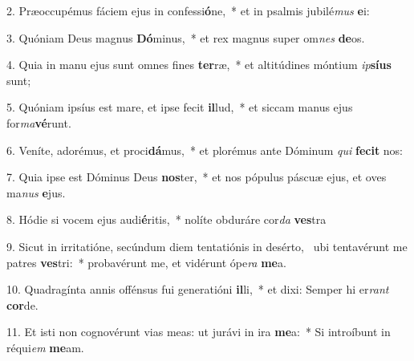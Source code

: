 2. Præoccupémus fáciem ejus in confessi\textbf{ó}ne,~*  et in psalmis jubilé\textit{mus} \textbf{e}i:\

3. Quóniam Deus magnus \textbf{Dó}minus,~*  et rex magnus super om\textit{nes} \textbf{de}os.\

4. Quia in manu ejus sunt omnes fines \textbf{ter}ræ,~*  et altitúdines móntium \textit{ip}\textbf{sí}\textbf{us} sunt;\

5. Quóniam ipsíus est mare, et ipse fecit \textbf{il}lud,~*  et siccam manus ejus for\textit{ma}\textbf{vé}runt.\

6. Veníte, adorémus, et proci\textbf{dá}mus,~*  et plorémus ante Dóminum \textit{qui} \textbf{fe}\textbf{cit} nos:\

7. Quia ipse est Dóminus Deus \textbf{nos}ter,~*  et nos pópulus páscuæ ejus, et oves ma\textit{nus} \textbf{e}jus.\

8. Hódie si vocem ejus audi\textbf{é}ritis,~*  nolíte obduráre cor\textit{da} \textbf{ves}tra\

9. Sicut in irritatióne, secúndum diem tentatiónis in desérto, \dag\  ubi tentavérunt me patres \textbf{ves}tri:~*  probavérunt me, et vidérunt ópe\textit{ra} \textbf{me}a.\

10. Quadragínta annis offénsus fui generatióni \textbf{il}li,~*  et dixi: Semper hi er\textit{rant} \textbf{cor}de.\

11. Et isti non cognovérunt vias meas: ut jurávi in ira \textbf{me}a:~*  Si introíbunt in réqui\textit{em} \textbf{me}am.\

